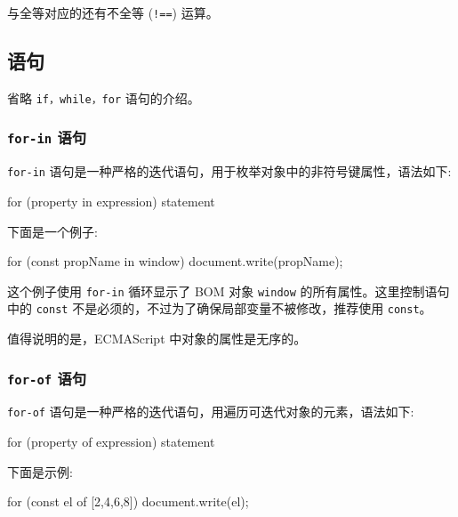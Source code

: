 与全等对应的还有不全等 (\texttt{!==}) 运算。


\subsection{语句}

省略 \texttt{if，while，for} 语句的介绍。

\subsubsection{\texttt{for-in} 语句}

\texttt{for-in} 语句是一种严格的迭代语句，用于枚举对象中的非符号键属性，语法如下:

\begin{JavaScript}
for (property in expression) statement
\end{JavaScript}

下面是一个例子:

\begin{JavaScript}
for (const propName in window) {
    document.write(propName);
}
\end{JavaScript}

这个例子使用 \texttt{for-in} 循环显示了 BOM 对象 \texttt{window} 的所有属性。这里控制语句中的 \texttt{const} 不是必须的，不过为了确保局部变量不被修改，推荐使用 \texttt{const}。

值得说明的是，ECMAScript 中对象的属性是无序的。

\subsubsection{\texttt{for-of} 语句}

\texttt{for-of} 语句是一种严格的迭代语句，用遍历可迭代对象的元素，语法如下:

\begin{JavaScript}
for (property of expression) statement
\end{JavaScript}

下面是示例:

\begin{JavaScript}
for (const el of [2,4,6,8]) {
    document.write(el);
}
\end{JavaScript}

